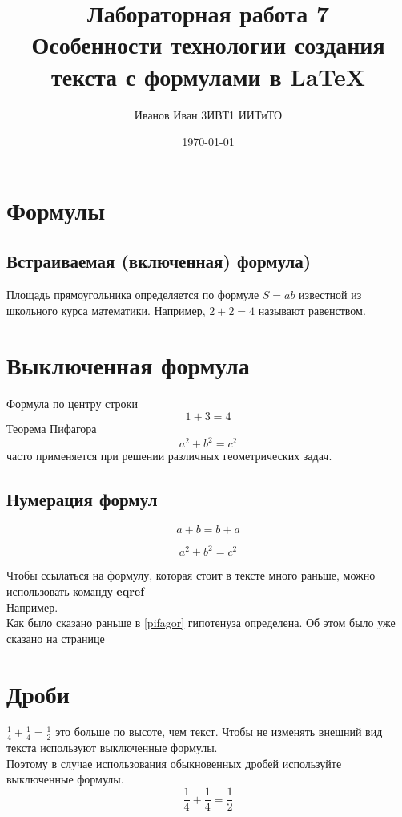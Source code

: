 \documentclass[a4paper,12pt]{article} %
\author{Иванов Иван 3ИВТ1 ИИТиТО}
\title{Лабораторная работа 7\\Особенности технологии создания текста с формулами в \LaTeX{}}
\date{\today}
\begin{document}
\maketitle
\newpage

\section{Формулы}
\subsection{Встраиваемая (включенная) формула)}
Площадь прямоугольника определяется по формуле $S=ab$ известной из школьного курса математики. Например, $ 2+2=4 $ называют равенством.

\section{Выключенная формула}
Формула по центру строки \[1+3=4\]
Теорема Пифагора $$ a^2+b^2=c^2 $$ часто применяется при решении различных геометрических задач.

\subsection{Нумерация формул}

\begin{equation}
a+b=b+a
\end{equation}

\begin{equation} \label{pifagor}
a^2+b^2=c^2
\end{equation}

Чтобы ссылаться на формулу, которая стоит в тексте много раньше, можно использовать команду \textbf{eqref}\\
Например.\\
Как было сказано раньше в
\eqref{pifagor} гипотенуза определена.
Об этом было уже сказано на странице \pageref{pifagor}

\section {Дроби}

$\frac{1}{4}+\frac{1}{4}= \frac{1}{2}$ это больше по высоте, чем текст. Чтобы не изменять внешний вид текста используют выключенные формулы.\\

Поэтому в случае использования обыкновенных дробей используйте выключенные формулы.
\[\frac{1}{4}+\frac{1}{4}= \frac{1}{2}\]
\newpage
\end{document}
